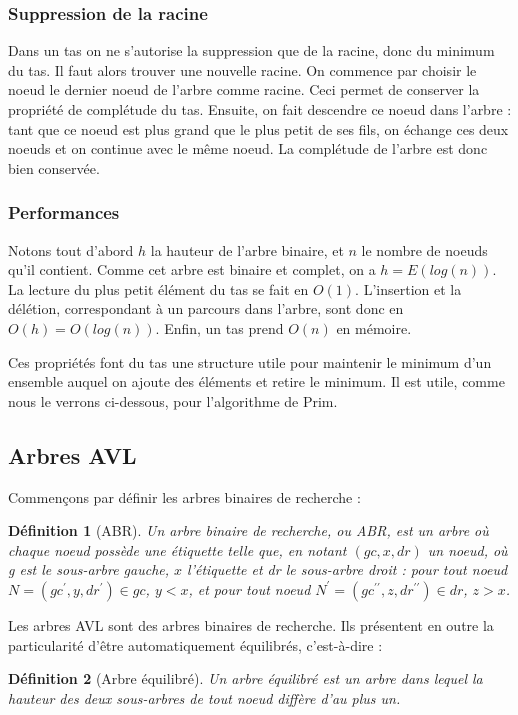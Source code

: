 \documentclass{article}
\newtheorem*{ddef}{Définition}
\begin{document}
\subsubsection{Suppression de la racine}
Dans un tas on ne s'autorise la suppression que de la racine, donc du minimum du tas. Il faut alors trouver une nouvelle racine. On commence par choisir le noeud le 
dernier noeud de l'arbre comme racine. Ceci permet de conserver la propriété de complétude du tas. Ensuite, on fait descendre ce noeud dans l'arbre : tant que ce noeud
est plus grand que le plus petit de ses fils, on échange ces deux noeuds et on continue avec le même noeud. La complétude de l'arbre est donc bien conservée.

\subsubsection{Performances}
Notons tout d'abord $h$ la hauteur de l'arbre binaire, et $n$ le nombre de noeuds qu'il contient. Comme cet arbre est binaire et complet, on a $h = E(log(n))$.
La lecture du plus petit élément du tas se fait en $O(1)$.
L'insertion et la délétion, correspondant à un parcours dans l'arbre, sont donc en $O(h) = O(log(n))$.
Enfin, un tas prend $O(n)$ en mémoire.


Ces propriétés font du tas une structure utile pour maintenir le minimum d'un ensemble auquel on ajoute des éléments et retire le minimum. Il est utile, comme nous le
verrons ci-dessous, pour l'algorithme de Prim.

\subsection{Arbres AVL}

Commençons par définir les arbres binaires de recherche :
\begin{ddef}[ABR]
Un arbre binaire de recherche, ou ABR, est un arbre où chaque noeud possède une étiquette telle que, en notant $(gc, x, dr)$ un noeud, où g est le sous-arbre gauche, $x$ l'étiquette et dr le sous-arbre droit : pour tout noeud $N = (gc^{\prime},y,dr^{\prime}) \in gc$, $y < x$, et
pour tout noeud $N^{\prime}=(gc^{\prime\prime},z,dr^{\prime\prime}) \in dr$, $z > x$.
\end{ddef}

Les arbres AVL sont des arbres binaires de recherche. Ils présentent en outre la particularité d'être automatiquement équilibrés, c'est-à-dire :

\begin{ddef}[Arbre équilibré]
Un arbre équilibré est un arbre dans lequel la hauteur des deux sous-arbres de tout noeud diffère d'au plus un.
\end{ddef}
\end{document}
